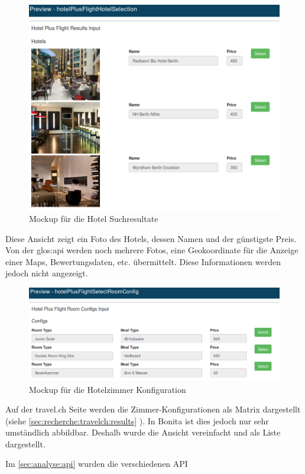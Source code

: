 \begin{figure}[H]
	\centering
	\includegraphics[width=1\textwidth]{images/forms-select-hotel.png}
	\caption{Mockup für die Hotel Suchresultate}
	\label{fig:konzept:mockups:selecthotel}
\end{figure}
Diese Ansicht zeigt ein Foto des Hotels, dessen Namen und der günstigste Preis. Von der \Gls{glos:api} werden noch mehrere Fotos, eine Geokoordinate für die Anzeige einer Maps, Bewertungsdaten, etc. übermittelt. Diese Informationen werden jedoch nicht angezeigt.

\begin{figure}[H]
	\centering
	\includegraphics[width=1\textwidth]{images/forms-select-roomconfig.png}
	\caption{Mockup für die Hotelzimmer Konfiguration}
	\label{fig:konzept:mockups:selectroomconfig}
\end{figure}
Auf der travel.ch Seite werden die Zimmer-Konfigurationen als Matrix dargestellt (siehe \cref{sec:recherche:travelch:results} ). In Bonita ist dies jedoch nur sehr umständlich abbildbar. Deshalb wurde die Ansicht vereinfacht und als Liste dargestellt.

Im \cref{sec:analyse:api}  wurden die verschiedenen API
